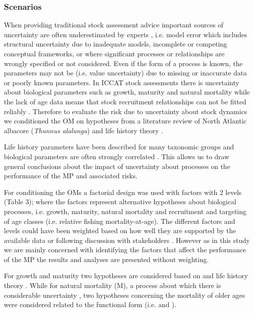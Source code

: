 \documentclass[%
nonumbib,      %
%
]{nrc1}                          %
\begin{document}
\subsubsection*{Scenarios} 

When providing traditional stock assessment advice important sources of uncertainty are often underestimated by experts \citep{morgan1990uncertainty},  i.e. model error which includes structural uncertainty due to inadequate models, incomplete or competing conceptual frameworks, or where significant processes or relationships are wrongly specified or not considered. Even if the form of a process is known, the parameters may not be (i.e. value uncertainty) due to missing or inaccurate data or poorly known parameters. In ICCAT stock assessments there is uncertainty about biological parameters such as growth, maturity and natural mortality while the lack of age data means that stock recruitment relationships can not be fitted reliably \citep{leach2014elicit}. Therefore to evaluate the risk due to uncertainty about stock dynamics we conditioned the OM on hypotheses from a literature review of North Atlantic albacore (\textit{Thunnus alalunga}) \citep{santiago2005integrated, santiago2004dinamica} and life history theory \citep{gislason2010does}. 

Life history parameters have been described for many taxonomic groups and biological parameters are often strongly correlated \cite[e.g.][]{blueweiss1978relationships,gislason2010does}. This allows us to draw general conclusions about the impact of uncertainty about processes on the performance of the MP and associated risks. 

For conditioning the OMs a factorial design was used with factors with 2 levels (Table 3); where the factors represent alternative hypotheses about biological processes, i.e. growth,  maturity, natural mortality and recruitment and targeting of age classes (i.e. relative fishing mortality-at-age). The different factors and levels could have been weighted based on how well they are supported by the available data or following discussion with stakeholders \citep{leach2014elicit}. However as in this study we are mainly concerned with identifying the factors that affect the performance of the MP the results and analyses are presented without weighting.
 
For growth and maturity two hypotheses are considered based on \citep{santiago2005integrated,santiago2004dinamica} and life history theory \citep{gislason2010does}. While for natural mortality (M), a process about which there is considerable uncertainty \citep{hamel2014method}, two hypotheses concerning the mortality of older ages were considered related to the functional form (i.e.  \citep{lorenzen2002density} and \citep{chen1989age}). 
\end{document}
